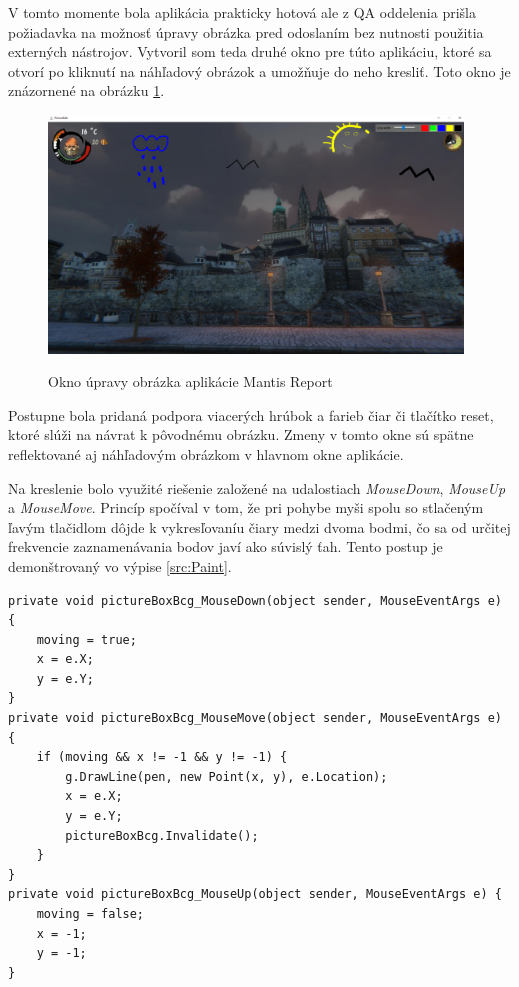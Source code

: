 \documentclass[slovak, bachelorpractice]{diploma}
\begin{document}
V tomto momente bola aplikácia prakticky hotová ale z QA oddelenia prišla požiadavka na možnosť úpravy obrázka pred odoslaním bez nutnosti použitia externých nástrojov. Vytvoril som teda druhé okno pre túto aplikáciu, ktoré sa otvorí po kliknutí na náhľadový obrázok a umožňuje do neho kresliť. Toto okno je znázornené na obrázku \ref{pic:Paint}. 

\begin{figure}[!htbp]
	\centering
	\mybox{} {
		\includegraphics[width=0.98\textwidth]{Pictures/pictureEditBox.png}
	}
	\caption{Okno úpravy obrázka aplikácie Mantis Report}
	\label{pic:Paint}
\end{figure}

Postupne bola pridaná podpora viacerých hrúbok a farieb čiar či tlačítko reset, ktoré slúži na návrat k pôvodnému obrázku. Zmeny v tomto okne sú spätne reflektované aj náhľadovým obrázkom v hlavnom okne aplikácie. 

Na kreslenie bolo využité riešenie založené na udalostiach \textit{MouseDown}, \textit{MouseUp} a \textit{MouseMove}. Princíp spočíval v tom, že pri pohybe myši spolu so stlačeným ľavým tlačidlom dôjde k vykresľovaníu čiary medzi dvoma bodmi, čo sa od určitej frekvencie zaznamenávania bodov javí ako súvislý ťah. Tento postup je demonštrovaný vo výpise \ref{src:Paint}.
\vspace{6pt}
\begin{lstlisting}[label=src:Paint,caption={Implementácia kreslenia v prostredí Windows Forms}]
private void pictureBoxBcg_MouseDown(object sender, MouseEventArgs e) {
    moving = true;
    x = e.X;
    y = e.Y;
}
private void pictureBoxBcg_MouseMove(object sender, MouseEventArgs e) {
    if (moving && x != -1 && y != -1) {
        g.DrawLine(pen, new Point(x, y), e.Location);
        x = e.X;
        y = e.Y;
        pictureBoxBcg.Invalidate();
    }
}
private void pictureBoxBcg_MouseUp(object sender, MouseEventArgs e) {
    moving = false;
    x = -1;
    y = -1;
}
\end{lstlisting}
\end{document}
